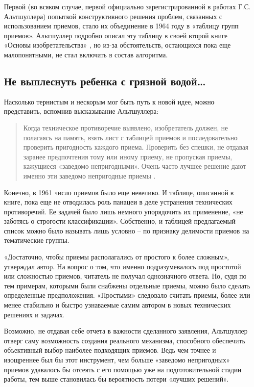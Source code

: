 \documentclass[11pt,a4paper]{article}
\begin{document}
Первой (во всяком случае, первой официально зарегистрированной в работах
Г.С. Альтшуллера) попыткой конструктивного решения проблем, связанных с
использованием приемов, стало их объединение в 1964 году в «таблицу групп
приемов». Альтшуллер подробно описал эту таблицу в своей второй книге «Основы
изобретательства» \cite{Altshuller1964}, но из-за обстоятельств, остающихся
пока еще малопонятными, не стал включать в состав алгоритма.

\subsection*{Не выплеснуть ребенка с грязной водой…}

Насколько тернистым и нескорым мог быть путь к новой идее, можно представить,
вспомнив высказывание Альтшуллера: 
\begin{quote}
  Когда техническое противоречие выявлено, изобретатель должен, не полагаясь
  на память, взять лист с таблицей приемов и последовательно проверить
  пригодность каждого приема. Проверить без спешки, не отдавая заранее
  предпочтения тому или иному приему, не пропуская приемы, кажущиеся «заведомо
  непригодными». Очень часто лучшее решение дают именно эти заведомо
  непригодные приемы \cite{Altshuller1961}.
\end{quote}

Конечно, в 1961 число приемов было еще невелико. И таблице, описанной в книге,
пока еще не отводилась роль панацеи в деле устранения технических
противоречий. Ее задачей было лишь немного упорядочить их применение, «не
заботясь о строгости классификации». Собственно, и таблицей предлагаемый
список можно было называть лишь условно -- по признаку делимости приемов на
тематические группы.

«Достаточно, чтобы приемы располагались от простого к более сложным»,
утверждал автор. На вопрос о том, что именно подразумевалось под простотой или
сложностью приемов, читатель не получал однозначного ответа. Но, судя по тем
примерам, которыми были снабжены отдельные приемы, можно было сделать
определенные предположения. «Простыми» следовало считать приемы, более или
менее стабильно и быстро узнаваемые самим автором в новых технических решениях
и задачах.

Возможно, не отдавая себе отчета в важности сделанного заявления, Альтшуллер
отверг саму возможность создания реального механизма, способного обеспечить
объективный выбор наиболее подходящих приемов. Ведь чем точнее и изощреннее
был бы этот инструмент, чем больше «заведомо непригодных» приемов удавалось бы
отсеять с его помощью уже на подготовительной стадии работы, тем выше
становилась бы вероятность потери «лучших решений».
\end{document}
